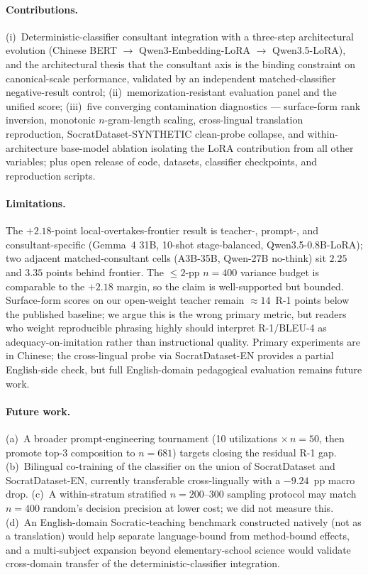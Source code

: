 \documentclass[11pt]{article}
\begin{document}
\paragraph{Contributions.} (i)~Deterministic-classifier consultant integration with a three-step architectural evolution (Chinese BERT $\to$ Qwen3-Embedding-LoRA $\to$ Qwen3.5-LoRA), and the architectural thesis that the consultant axis is the binding constraint on canonical-scale performance, validated by an independent matched-classifier negative-result control; (ii)~memorization-resistant evaluation panel and the unified score; (iii)~five converging contamination diagnostics --- surface-form rank inversion, monotonic $n$-gram-length scaling, cross-lingual translation reproduction, SocratDataset-SYNTHETIC clean-probe collapse, and within-architecture base-model ablation isolating the LoRA contribution from all other variables; plus open release of code, datasets, classifier checkpoints, and reproduction scripts.

\paragraph{Limitations.} The $+2.18$-point local-overtakes-frontier result is teacher-, prompt-, and consultant-specific (Gemma~4 31B, 10-shot stage-balanced, Qwen3.5-0.8B-LoRA); two adjacent matched-consultant cells (A3B-35B, Qwen-27B no-think) sit $2.25$ and $3.35$ points behind frontier. The $\leq 2$-pp $n{=}400$ variance budget is comparable to the $+2.18$ margin, so the claim is well-supported but bounded. Surface-form scores on our open-weight teacher remain $\approx 14$~R-1 points below the published baseline; we argue this is the wrong primary metric, but readers who weight reproducible phrasing highly should interpret R-1/BLEU-4 as adequacy-on-imitation rather than instructional quality. Primary experiments are in Chinese; the cross-lingual probe via SocratDataset-EN provides a partial English-side check, but full English-domain pedagogical evaluation remains future work.

\paragraph{Future work.} (a)~A broader prompt-engineering tournament (10 utilizations $\times\,n{=}50$, then promote top-3 composition to $n{=}681$) targets closing the residual R-1 gap. (b)~Bilingual co-training of the classifier on the union of SocratDataset and SocratDataset-EN, currently transferable cross-lingually with a $-9.24$~pp macro drop. (c)~A within-stratum stratified $n{=}200$--$300$ sampling protocol may match $n{=}400$ random's decision precision at lower cost; we did not measure this. (d)~An English-domain Socratic-teaching benchmark constructed natively (not as a translation) would help separate language-bound from method-bound effects, and a multi-subject expansion beyond elementary-school science would validate cross-domain transfer of the deterministic-classifier integration.
\end{document}

